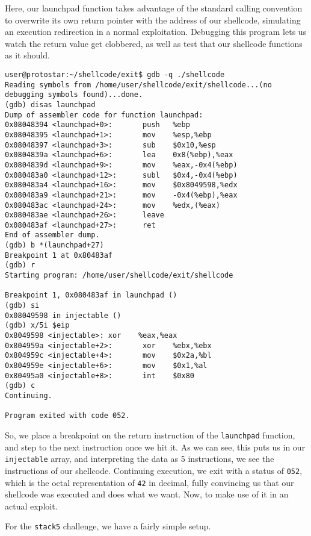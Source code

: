 Here, our launchpad function takes advantage of the standard calling convention to overwrite its own
return pointer with the address of our shellcode, simulating an execution redirection in
a normal exploitation. Debugging this program lets us watch the return value get clobbered, as
well as test that our shellcode functions as it should.

\begin{lstlisting}
user@protostar:~/shellcode/exit$ gdb -q ./shellcode
Reading symbols from /home/user/shellcode/exit/shellcode...(no debugging symbols found)...done.
(gdb) disas launchpad
Dump of assembler code for function launchpad:
0x08048394 <launchpad+0>:       push   %ebp
0x08048395 <launchpad+1>:       mov    %esp,%ebp
0x08048397 <launchpad+3>:       sub    $0x10,%esp
0x0804839a <launchpad+6>:       lea    0x8(%ebp),%eax
0x0804839d <launchpad+9>:       mov    %eax,-0x4(%ebp)
0x080483a0 <launchpad+12>:      subl   $0x4,-0x4(%ebp)
0x080483a4 <launchpad+16>:      mov    $0x8049598,%edx
0x080483a9 <launchpad+21>:      mov    -0x4(%ebp),%eax
0x080483ac <launchpad+24>:      mov    %edx,(%eax)
0x080483ae <launchpad+26>:      leave  
0x080483af <launchpad+27>:      ret    
End of assembler dump.
(gdb) b *(launchpad+27)
Breakpoint 1 at 0x80483af
(gdb) r
Starting program: /home/user/shellcode/exit/shellcode 

Breakpoint 1, 0x080483af in launchpad ()
(gdb) si
0x08049598 in injectable ()
(gdb) x/5i $eip
0x8049598 <injectable>: xor    %eax,%eax
0x804959a <injectable+2>:       xor    %ebx,%ebx
0x804959c <injectable+4>:       mov    $0x2a,%bl
0x804959e <injectable+6>:       mov    $0x1,%al
0x80495a0 <injectable+8>:       int    $0x80
(gdb) c
Continuing.

Program exited with code 052.
\end{lstlisting}

So, we place a breakpoint on the return instruction of
the \texttt{launchpad} function, and step to the next
instruction once we hit it. As we can see, this puts us
in our \texttt{injectable} array, and interpreting the 
data as 5 instructions, we see the instructions of our shellcode.
Continuing execution, we exit with a status of \texttt{052},
which is the octal representation of \texttt{42} in decimal,
fully convincing us that our shellcode was executed and does
what we want. Now, to make use of it in an actual exploit.

For the \texttt{stack5} challenge, we have a fairly simple setup.



